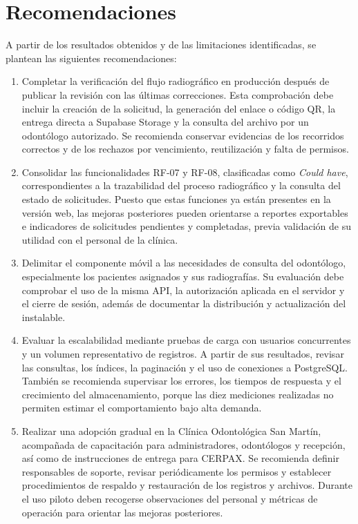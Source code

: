 \section{Recomendaciones}

A partir de los resultados obtenidos y de las limitaciones identificadas,
se plantean las siguientes recomendaciones:

\begin{enumerate}
    \item Completar la verificación del flujo radiográfico en producción
    después de publicar la revisión con las últimas correcciones.
    Esta comprobación debe incluir la creación de la solicitud,
    la generación del enlace o código QR, la entrega directa a Supabase
    Storage y la consulta del archivo por un odontólogo autorizado.
    Se recomienda conservar evidencias de los recorridos correctos
    y de los rechazos por vencimiento, reutilización y falta de permisos.

    \item Consolidar las funcionalidades RF-07 y RF-08, clasificadas
    como \textit{Could have}, correspondientes a la trazabilidad
    del proceso radiográfico y la consulta del estado de solicitudes.
    Puesto que estas funciones ya están presentes en la versión web,
    las mejoras posteriores pueden orientarse a reportes exportables
    e indicadores de solicitudes pendientes y completadas, previa
    validación de su utilidad con el personal de la clínica.

    \item Delimitar el componente móvil a las necesidades de consulta
    del odontólogo, especialmente los pacientes asignados y sus
    radiografías. Su evaluación debe comprobar el uso de la misma API,
    la autorización aplicada en el servidor y el cierre de sesión,
    además de documentar la distribución y actualización del instalable.

    \item Evaluar la escalabilidad mediante pruebas de carga con
    usuarios concurrentes y un volumen representativo de registros.
    A partir de sus resultados, revisar las consultas, los índices,
    la paginación y el uso de conexiones a PostgreSQL. También se
    recomienda supervisar los errores, los tiempos de respuesta
    y el crecimiento del almacenamiento, porque las diez mediciones
    realizadas no permiten estimar el comportamiento bajo alta demanda.

    \item Realizar una adopción gradual en la Clínica Odontológica
    San Martín, acompañada de capacitación para administradores,
    odontólogos y recepción, así como de instrucciones de entrega
    para CERPAX. Se recomienda definir responsables de soporte,
    revisar periódicamente los permisos y establecer procedimientos
    de respaldo y restauración de los registros y archivos.
    Durante el uso piloto deben recogerse observaciones del personal
    y métricas de operación para orientar las mejoras posteriores.
\end{enumerate}
